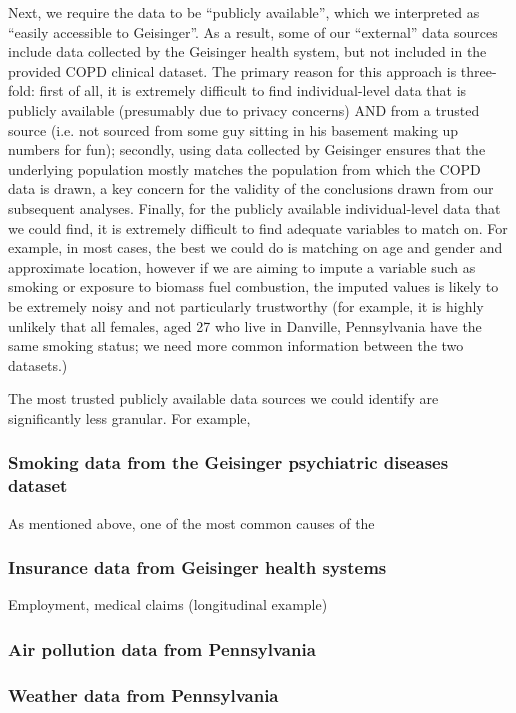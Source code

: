 \documentclass{article}
\begin{document}
Next, we require the data to be ``publicly available'', which we interpreted as ``easily accessible to Geisinger''. As a result, some of our ``external'' data sources include data collected by the Geisinger health system, but not included in the provided COPD clinical dataset. The primary reason for this approach is three-fold: first of all, it is extremely difficult to find individual-level data that is publicly available (presumably due to privacy concerns) AND from a trusted source (i.e. not sourced from some guy sitting in his basement making up numbers for fun); secondly, using data collected by Geisinger ensures that the underlying population mostly matches the population from which the COPD data is drawn, a key concern for the validity of the conclusions drawn from our subsequent analyses. Finally, for the publicly available individual-level data that we could find, it is extremely difficult to find adequate variables to match on. For example, in most cases, the best we could do is matching on age and gender and approximate location, however if we are aiming to impute a variable such as smoking or exposure to biomass fuel combustion, the imputed values is likely to be extremely noisy and not particularly trustworthy (for example, it is highly unlikely that all females, aged 27 who live in Danville, Pennsylvania have the same smoking status; we need more common information between the two datasets.)

The most trusted publicly available data sources we could identify are significantly less granular. For example, 

\subsubsection{Smoking data from the Geisinger psychiatric diseases dataset}

As mentioned above, one of the most common causes of the


\subsubsection{Insurance data from Geisinger health systems}
Employment, medical claims (longitudinal example)


\subsubsection{Air pollution data from Pennsylvania}


\subsubsection{Weather data from Pennsylvania}
\end{document}

